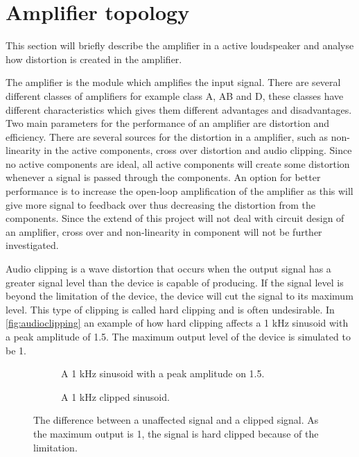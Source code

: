 \section{Amplifier topology}
This section will briefly describe the amplifier in a active loudspeaker and analyse how distortion is created in the amplifier.

The amplifier is the module which amplifies the input signal. There are several different classes of amplifiers for example class A, AB and D, these classes have different characteristics which gives them different advantages and disadvantages. Two main parameters for the performance of an amplifier are distortion and efficiency. There are several sources for the distortion in a amplifier, such as non-linearity in the active components, cross over distortion and audio clipping. Since no active components are ideal, all active components will create some distortion whenever a signal is passed through the components. An option for better performance is to increase the open-loop amplification of the amplifier as this will give more signal to feedback over thus decreasing the distortion from the components. Since the extend of this project will not deal with circuit design of an amplifier, cross over and non-linearity in component will not be further investigated.

Audio clipping is a wave distortion that occurs when the output signal has a greater signal level than the device is capable of producing. If the signal level is beyond the limitation of the device, the device will cut the signal to its maximum level. This type of clipping is called hard clipping and is often undesirable. In \autoref{fig:audioclipping} an example of how hard clipping affects a 1 kHz sinusoid with a peak amplitude of 1.5. The maximum output level of the device is simulated to be 1.

\begin{figure}[H]
\centering
\begin{subfigure}[t]{0.47\textwidth}
	
	\caption{A 1 kHz sinusoid with a peak amplitude on 1.5.}
	\label{fig:clippingClean}
\end{subfigure}
\hspace{6mm} 
\begin{subfigure}[t]{0.47\textwidth}
	
	\caption{A 1 kHz clipped sinusoid.}
	\label{fig:clippingDist}
\end{subfigure}
\caption{The difference between a unaffected signal and a clipped signal. As the maximum output is 1, the signal is hard clipped because of the limitation.}
\label{fig:audioclipping}
\end{figure}

